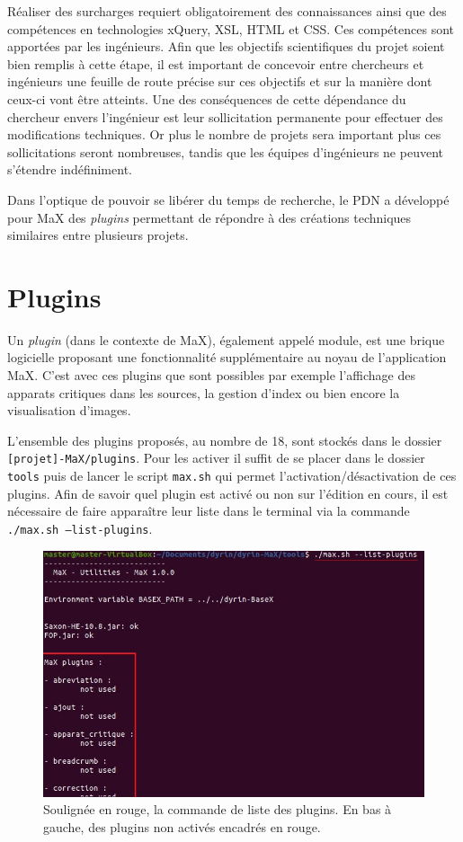 \documentclass[a4paper,12pt,twoside]{book}
\begin{document}
Réaliser des surcharges requiert obligatoirement des connaissances ainsi que des compétences en technologies xQuery, \acrshort{XSL}, \acrshort{HTML} et CSS. Ces compétences sont apportées par les ingénieurs. Afin que les objectifs scientifiques du projet soient bien remplis à cette étape, il est important de concevoir entre chercheurs et ingénieurs une feuille de route précise sur ces objectifs et sur la manière dont ceux-ci vont être atteints.
Une des conséquences de cette dépendance du chercheur envers l'ingénieur est leur sollicitation permanente pour effectuer des modifications techniques. Or plus le nombre de projets sera important plus ces sollicitations seront nombreuses, tandis que les équipes d'ingénieurs ne peuvent s'étendre indéfiniment.


Dans l'optique de pouvoir se libérer du temps de recherche, le \acrshort{PDN} a développé pour MaX des \textit{plugins} permettant de répondre à des créations techniques similaires entre plusieurs projets.

\section{Plugins}\label{plugin}

Un \textit{plugin} (dans le contexte de MaX), également appelé module, est une brique logicielle proposant une fonctionnalité supplémentaire au noyau de l'application MaX. C'est avec ces plugins que sont possibles par exemple l'affichage des apparats critiques dans les sources, la gestion d'index ou bien encore la visualisation d'images. 

L'ensemble des plugins proposés, au nombre de 18, sont stockés dans le dossier \texttt{[projet]-MaX/plugins}. Pour les activer il suffit de se placer dans le dossier \texttt{tools} puis de lancer le script \texttt{max.sh} qui permet l'activation/désactivation de ces plugins. Afin de savoir quel plugin est activé ou non sur l'édition en cours, il est nécessaire de faire apparaître leur liste dans le terminal via la commande \texttt{./max.sh --list-plugins}. 


\begin{figure}[H]
    \centering
    \includegraphics[width=12cm]{img/partie_2/plugins.JPG}
    \caption{Soulignée en rouge, la commande de liste des plugins. En bas à gauche, des plugins non activés encadrés en rouge.}
\end{figure}
\end{document}
